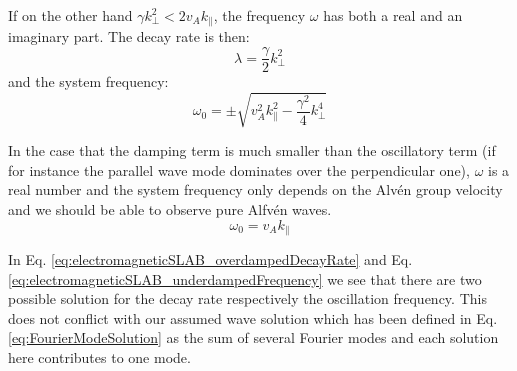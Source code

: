 If on the other hand $\gamma k_\perp^2 < 2v_Ak_\parallel$, the frequency $\omega$ has both a real and an imaginary part. The decay rate is then:
\begin{equation} 
	\lambda = \frac{\gamma}{2}k_\perp^2 \label{eq:electromagneticSLAB_underdampedDecayRate}
\end{equation}
and the system frequency: 
\begin{equation} 
	\omega_0 = \pm\sqrt{v_A^2k_\parallel^2 - \frac{\gamma^2}{4}k_\perp^4} \label{eq:electromagneticSLAB_underdampedFrequency}
\end{equation}

In the case that the damping term is much smaller than the oscillatory term (if for instance the parallel wave mode dominates over the perpendicular one), $\omega$ is a real number and the system frequency only depends on the Alvén group velocity and we should be able to observe pure Alfvén waves.
$$ \omega_0 = v_A k_\parallel$$

In Eq. \ref{eq:electromagneticSLAB_overdampedDecayRate} and Eq. \ref{eq:electromagneticSLAB_underdampedFrequency} we see that there are two possible solution for the decay rate respectively the oscillation frequency. This does not conflict with our assumed wave solution which has been defined in Eq. \ref{eq:FourierModeSolution} as the sum of several Fourier modes and each solution here contributes to one mode. 
 
